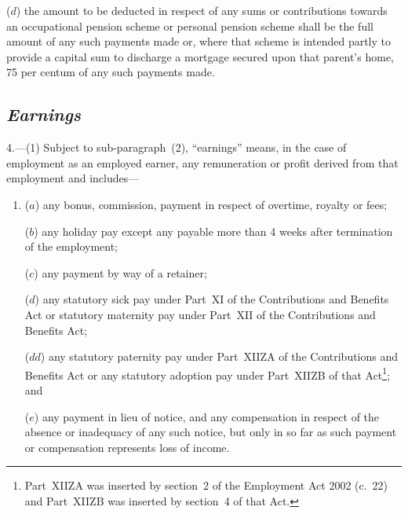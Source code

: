 \documentclass[12pt,a4paper]{article}
\begin{document}
\begin{enumerate}
($d$) the amount to be deducted in respect of any sums or contributions towards an occupational pension scheme or personal pension scheme shall be the full amount of any such payments made or, where that scheme is intended partly to provide a capital sum to discharge a mortgage secured upon that parent’s home, 75 per centum of any such payments made.
\end{enumerate}

\subsection*{\itshape Earnings}

4.---(1)  Subject to sub-paragraph~(2), “earnings” means, in the case of employment as an employed earner, any remuneration or profit derived from that employment and includes—
\begin{enumerate}\item[]
($a$) any bonus, commission, payment in respect of overtime, royalty or fees;

($b$) any holiday pay except any payable more than 4 weeks after termination of the employment;

($c$) any payment by way of a retainer;

($d$) any statutory sick pay under Part~XI of the Contributions and Benefits Act or statutory maternity pay under Part~XII of the Contributions and Benefits Act; 

($dd$) any statutory paternity pay under Part~XIIZA of the Contributions and Benefits Act or any statutory adoption pay under Part~XIIZB of that Act\footnote{Part~XIIZA was inserted by section~2 of the Employment Act 2002 (c.\ 22) and Part~XIIZB was inserted by section~4 of that Act.};
and

($e$) any payment in lieu of notice, and any compensation in respect of the absence or inadequacy of any such notice, but only in so far as such payment or compensation represents loss of income.
\end{enumerate}
\end{document}
